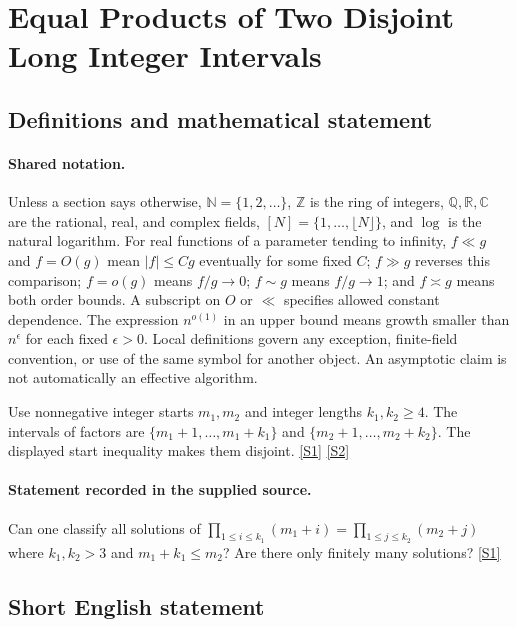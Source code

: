 \documentclass[11pt,a4paper]{article}
\newcommand{\N}{\mathbb{N}}
\newcommand{\Z}{\mathbb{Z}}
\newcommand{\Q}{\mathbb{Q}}
\newcommand{\R}{\mathbb{R}}
\newcommand{\C}{\mathbb{C}}
\newcommand{\sref}[2]{\hyperlink{source:#1:#2}{[S#2]}}
\begin{document}
\section{Equal Products of Two Disjoint Long Integer Intervals}\label{statement}


\subsection{Definitions and mathematical statement}

\paragraph{Shared notation.}Unless a section says otherwise, $\N=\{1,2,\ldots\}$,
$\Z$ is the ring of integers, $\Q,\R,\C$ are the rational, real, and complex
fields, $[N]=\{1,\ldots,\lfloor N\rfloor\}$, and $\log$ is the natural
logarithm. For real functions of a parameter tending to infinity,
$f\ll g$ and $f=O(g)$ mean $|f|\leq Cg$ eventually for some fixed $C$;
$f\gg g$ reverses this comparison; $f=o(g)$ means $f/g\to0$;
$f\sim g$ means $f/g\to1$; and $f\asymp g$ means both order bounds.
A subscript on $O$ or $\ll$ specifies allowed constant dependence.
The expression $n^{o(1)}$ in an upper bound means growth smaller than
$n^\epsilon$ for each fixed $\epsilon>0$. Local definitions govern any
exception, finite-field convention, or use of the same symbol for another
object. An asymptotic claim is not automatically an effective algorithm.



Use nonnegative integer starts $m_1,m_2$ and integer lengths $k_1,k_2\geq4$. The intervals of factors are $\{m_1+1,\ldots,m_1+k_1\}$ and $\{m_2+1,\ldots,m_2+k_2\}$. The displayed start inequality makes them disjoint. \sref{statement}{1} \sref{statement}{2}

\paragraph{Statement recorded in the supplied source.}
Can one classify all solutions of $ \prod_{1\leq i\leq k_1}(m_1+i)=\prod_{1\leq j\leq k_2}(m_2+j) $ where $k_1,k_2>3$ and $m_1+k_1\leq m_2$? Are there only finitely many solutions? \sref{statement}{1}

\subsection{Short English statement}
\end{document}
